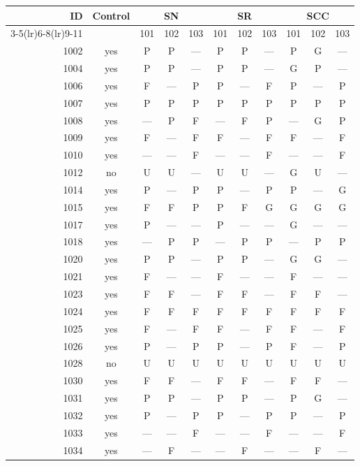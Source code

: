 \begin{table}[p]\centering\small
\begin{tabular*}{\textwidth}{@{\extracolsep{\fill}}rc*{9}{c}@{}}\toprule
ID & Control & \multicolumn{3}{c}{SN} & \multicolumn{3}{c}{SR} & \multicolumn{3}{c}{SCC}\\
\cmidrule(lr){3-5}\cmidrule(lr){6-8}\cmidrule(lr){9-11}
 & & 101 & 102 & 103 & 101 & 102 & 103 & 101 & 102 & 103\\\midrule
1002 & yes & P & P & — & P & P & — & P & G & —\\
1004 & yes & P & P & — & P & P & — & G & P & —\\
1006 & yes & F & — & P & P & — & F & P & — & P\\
1007 & yes & P & P & P & P & P & P & P & P & P\\
1008 & yes & — & P & F & — & F & P & — & G & P\\
1009 & yes & F & — & F & F & — & F & F & — & F\\
1010 & yes & — & — & F & — & — & F & — & — & F\\
1012 & no & U & U & — & U & U & — & G & U & —\\
1014 & yes & P & — & P & P & — & P & P & — & G\\
1015 & yes & F & F & P & P & F & G & G & G & G\\
1017 & yes & P & — & — & P & — & — & G & — & —\\
1018 & yes & — & P & P & — & P & P & — & P & P\\
1020 & yes & P & P & — & P & P & — & G & G & —\\
1021 & yes & F & — & — & F & — & — & F & — & —\\
1023 & yes & F & F & — & F & F & — & F & F & —\\
1024 & yes & F & F & F & F & F & F & F & F & F\\
1025 & yes & F & — & F & F & — & F & F & — & F\\
1026 & yes & P & — & P & P & — & P & F & — & P\\
1028 & no & U & U & U & U & U & U & U & U & U\\
1030 & yes & F & F & — & F & F & — & F & F & —\\
1031 & yes & P & P & — & P & P & — & P & G & —\\
1032 & yes & P & — & P & P & — & P & P & — & P\\
1033 & yes & — & — & F & — & — & F & — & — & F\\
1034 & yes & — & F & — & — & F & — & — & F & —\\

\end{tabular*}
\end{table}

